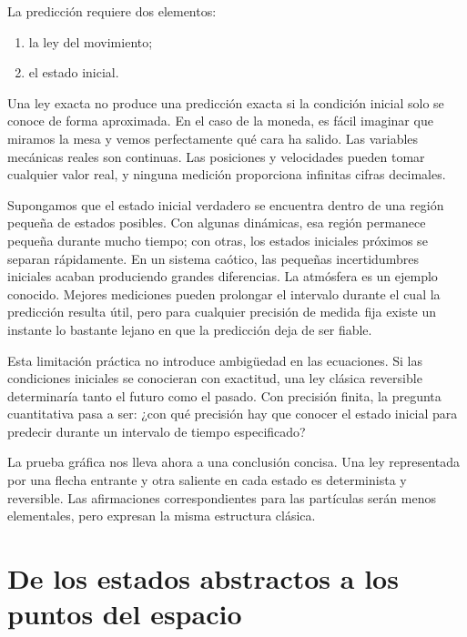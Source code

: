La predicción requiere dos elementos:
\begin{enumerate}
  \item la ley del movimiento;
  \item el estado inicial.
\end{enumerate}
Una ley exacta no produce una predicción exacta si la condición inicial solo se
conoce de forma aproximada. En el caso de la moneda, es fácil imaginar que
miramos la mesa y vemos perfectamente qué cara ha salido. Las variables
mecánicas reales son continuas. Las posiciones y velocidades pueden tomar
cualquier valor real, y ninguna medición proporciona infinitas cifras decimales.

Supongamos que el estado inicial verdadero se encuentra dentro de una región
pequeña de estados posibles. Con algunas dinámicas, esa región permanece pequeña
durante mucho tiempo; con otras, los estados iniciales próximos se separan
rápidamente. En un sistema caótico, las pequeñas incertidumbres iniciales acaban
produciendo grandes diferencias. La atmósfera es un ejemplo conocido. Mejores
mediciones pueden prolongar el intervalo durante el cual la predicción resulta
útil, pero para cualquier precisión de medida fija existe un instante lo bastante
lejano en que la predicción deja de ser fiable.

Esta limitación práctica no introduce ambigüedad en las ecuaciones. Si las
condiciones iniciales se conocieran con exactitud, una ley clásica reversible
determinaría tanto el futuro como el pasado. Con precisión finita, la pregunta
cuantitativa pasa a ser: ¿con qué precisión hay que conocer el estado inicial
para predecir durante un intervalo de tiempo especificado?

La prueba gráfica nos lleva ahora a una conclusión concisa. Una ley representada
por una flecha entrante y otra saliente en cada estado es determinista y
reversible. Las afirmaciones correspondientes para las partículas serán menos
elementales, pero expresan la misma estructura clásica.

\section{De los estados abstractos a los puntos del espacio}

